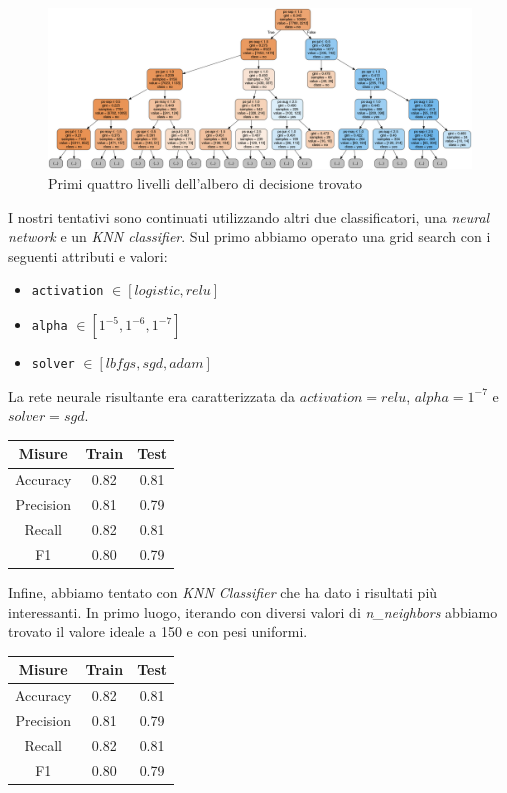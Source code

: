 \begin{figure}[H]
	\centering
	\includegraphics[width=\linewidth]{img/tree.png}
	\caption[LOF entry]{Primi quattro livelli dell'albero di decisione trovato}
	\label{tree}
\end{figure} 

I nostri tentativi sono continuati utilizzando altri due classificatori,
una \textit{neural network} e un \textit{KNN classifier}. Sul primo
abbiamo operato una grid search con i seguenti attributi e valori:

\begin{itemize}
	\item \texttt{activation} $\in [logistic, relu]$
	\item \texttt{alpha} $\in [1^{-5}, 1^{-6}, 1^{-7}]$
	\item \texttt{solver} $\in [lbfgs, sgd, adam]$
\end{itemize}

La rete neurale risultante era caratterizzata da $activation=relu$,
$alpha=1^{-7}$ e $solver=sgd$.

\begin{center}
	\begin{tabular}{c|c|c}
		\hline
		\textbf{Misure} & \textbf{Train} & \textbf{Test}\\
		\hline
		Accuracy & 0.82 & 0.81\\
		\hline
		Precision & 0.81 & 0.79\\
		\hline
		Recall & 0.82 & 0.81\\
		\hline
		F1 & 0.80 & 0.79\\
		\hline
	\end{tabular}
\end{center}

Infine, abbiamo tentato con \textit{KNN Classifier} che ha dato i risultati
pi\`u interessanti. In primo luogo, iterando con diversi valori di
\textit{n\_neighbors} abbiamo trovato il valore ideale a 150 e con pesi
uniformi.

\begin{center}
	\begin{tabular}{c|c|c}
		\hline
		\textbf{Misure} & \textbf{Train} & \textbf{Test}\\
		\hline
		Accuracy & 0.82 & 0.81\\
		\hline
		Precision & 0.81 & 0.79\\
		\hline
		Recall & 0.82 & 0.81\\
		\hline
		F1 & 0.80 & 0.79\\
		\hline
	\end{tabular}
\end{center}

